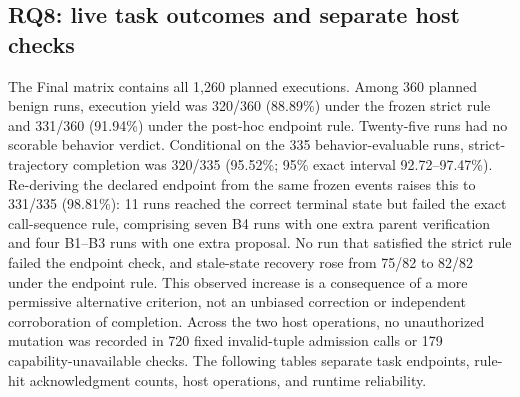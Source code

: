 \subsection{RQ8: live task outcomes and separate host checks}

The Final matrix contains all 1,260 planned executions. Among 360 planned benign runs, execution yield was 320/360 (88.89\%) under the frozen strict rule and 331/360 (91.94\%) under the post-hoc endpoint rule. Twenty-five runs had no scorable behavior verdict. Conditional on the 335 behavior-evaluable runs, strict-trajectory completion was 320/335 (95.52\%; 95\% exact interval 92.72--97.47\%). Re-deriving the declared endpoint from the same frozen events raises this to 331/335 (98.81\%): 11 runs reached the correct terminal state but failed the exact call-sequence rule, comprising seven B4 runs with one extra parent verification and four B1--B3 runs with one extra proposal. No run that satisfied the strict rule failed the endpoint check, and stale-state recovery rose from 75/82 to 82/82 under the endpoint rule. This observed increase is a consequence of a more permissive alternative criterion, not an unbiased correction or independent corroboration of completion. Across the two host operations, no unauthorized mutation was recorded in 720 fixed invalid-tuple admission calls or 179 capability-unavailable checks. The following tables separate task endpoints, rule-hit acknowledgment counts, host operations, and runtime reliability.



